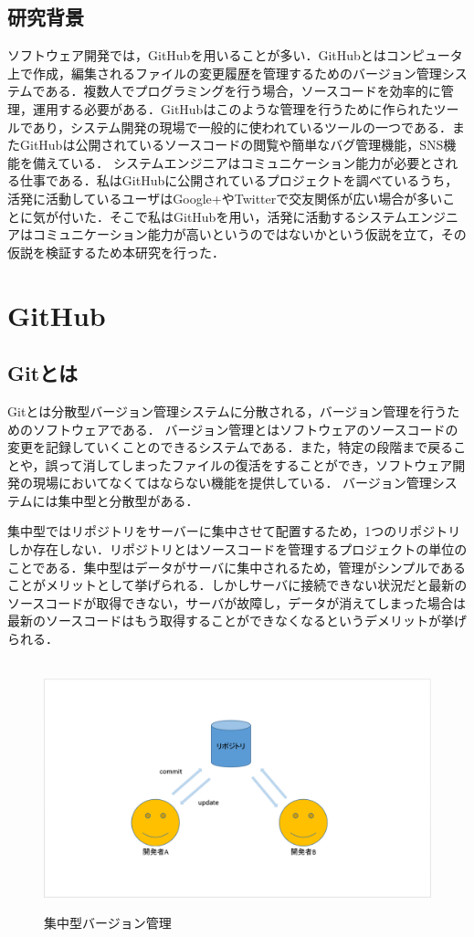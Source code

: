 \section{研究背景}
ソフトウェア開発では，GitHubを用いることが多い．GitHubとはコンピュータ上で作成，編集されるファイルの変更履歴を管理するためのバージョン管理システムである．複数人でプログラミングを行う場合，ソースコードを効率的に管理，運用する必要がある．GitHubはこのような管理を行うために作られたツールであり，システム開発の現場で一般的に使われているツールの一つである．またGitHubは公開されているソースコードの閲覧や簡単なバグ管理機能，SNS機能を備えている．
システムエンジニアはコミュニケーション能力が必要とされる仕事である．私はGitHubに公開されているプロジェクトを調べているうち，活発に活動しているユーザはGoogle+やTwitterで交友関係が広い場合が多いことに気が付いた．そこで私はGitHubを用い，活発に活動するシステムエンジニアはコミュニケーション能力が高いというのではないかという仮説を立て，その仮説を検証するため本研究を行った．



\chapter{GitHub}


\section{Gitとは}
Gitとは分散型バージョン管理システムに分散される，バージョン管理を行うためのソフトウェアである．
バージョン管理とはソフトウェアのソースコードの変更を記録していくことのできるシステムである．また，特定の段階まで戻ることや，誤って消してしまったファイルの復活をすることができ，ソフトウェア開発の現場においてなくてはならない機能を提供している．
バージョン管理システムには集中型と分散型がある．\cite{b}

\newpage
集中型ではリポジトリをサーバーに集中させて配置するため，1つのリポジトリしか存在しない．リポジトリとはソースコードを管理するプロジェクトの単位のことである．集中型はデータがサーバに集中されるため，管理がシンプルであることがメリットとして挙げられる．しかしサーバに接続できない状況だと最新のソースコードが取得できない，サーバが故障し，データが消えてしまった場合は最新のソースコードはもう取得することができなくなるというデメリットが挙げられる．




\begin{figure}[htb]
\centering　
\includegraphics[width=13cm]{syuutyuu.PNG}
\caption{集中型バージョン管理}
\end{figure}

